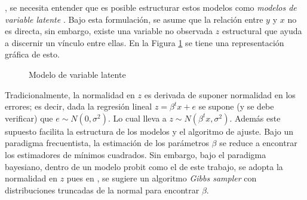 \documentclass[../Main/Main.tex]{subfiles}
\begin{document}
, se necesita entender que es posible estructurar estos modelos como \textit{modelos de variable latente} \autocite{albert1993bayesian}. Bajo esta formulación, se asume que la relación entre $y$ y $x$ no es directa, sin embargo, existe una variable no observada $z$ estructural que ayuda a discernir un vínculo entre ellas. En la Figura \ref{fig:DiagramaVar} se tiene una representación gráfica de esto. 

\begin{figure}[h]
\centering
{}
\caption{Modelo de variable latente}
\label{fig:DiagramaVar}
\end{figure}

Tradicionalmente, la normalidad en $z$ es derivada de suponer normalidad en los errores; es decir, dada la regresión lineal $z = \beta^tx + e$ se supone (y se debe verificar) que $e \sim N(0,\sigma^2)$. Lo cual lleva a $z \sim N(\beta^tx,\sigma^2)$. Además este supuesto facilita la estructura de los modelos y el algoritmo de ajuste. Bajo un paradigma frecuentista, la estimación de los parámetros $\beta$ se reduce a encontrar los estimadores de mínimos cuadrados. Sin embargo, bajo el paradigma bayesiano, dentro de un modelo probit como el de este trabajo, se adopta la normalidad en $z$ pues en \citet{albert1993bayesian}, se sugiere un algoritmo \textit{Gibbs sampler} con distribuciones truncadas de la normal para encontrar $\beta$.
\end{document}

